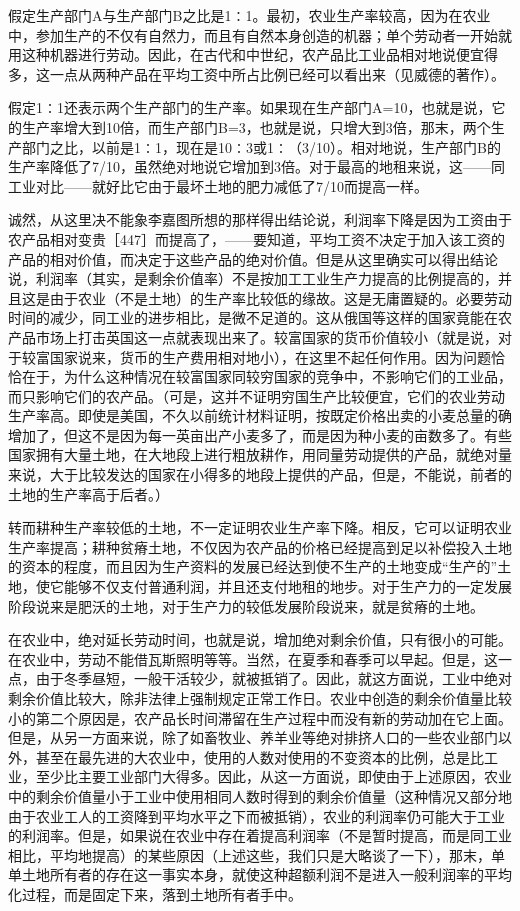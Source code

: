 假定生产部门A与生产部门B之比是1∶1。最初，农业生产率较高，因为在农业中，参加生产的不仅有自然力，而且有自然本身创造的机器；单个劳动者一开始就用这种机器进行劳动。因此，在古代和中世纪，农产品比工业品相对地说便宜得多，这一点从两种产品在平均工资中所占比例已经可以看出来（见威德的著作）。

假定1∶1还表示两个生产部门的生产率。如果现在生产部门A=10，也就是说，它的生产率增大到10倍，而生产部门B=3，也就是说，只增大到3倍，那末，两个生产部门之比，以前是1∶1，现在是10∶3或1∶（3/10）。相对地说，生产部门B的生产率降低了7/10，虽然绝对地说它增加到3倍。对于最高的地租来说，这——同工业对比——就好比它由于最坏土地的肥力减低了7/10而提高一样。

诚然，从这里决不能象李嘉图所想的那样得出结论说，利润率下降是因为工资由于农产品相对变贵［447］而提高了，——要知道，平均工资不决定于加入该工资的产品的相对价值，而决定于这些产品的绝对价值。但是从这里确实可以得出结论说，利润率（其实，是剩余价值率）不是按加工工业生产力提高的比例提高的，并且这是由于农业（不是土地）的生产率比较低的缘故。这是无庸置疑的。必要劳动时间的减少，同工业的进步相比，是微不足道的。这从俄国等这样的国家竟能在农产品市场上打击英国这一点就表现出来了。较富国家的货币价值较小（就是说，对于较富国家说来，货币的生产费用相对地小），在这里不起任何作用。因为问题恰恰在于，为什么这种情况在较富国家同较穷国家的竞争中，不影响它们的工业品，而只影响它们的农产品。（可是，这并不证明穷国生产比较便宜，它们的农业劳动生产率高。即使是美国，不久以前统计材料证明，按既定价格出卖的小麦总量的确增加了，但这不是因为每一英亩出产小麦多了，而是因为种小麦的亩数多了。有些国家拥有大量土地，在大地段上进行粗放耕作，用同量劳动提供的产品，就绝对量来说，大于比较发达的国家在小得多的地段上提供的产品，但是，不能说，前者的土地的生产率高于后者。）

转而耕种生产率较低的土地，不一定证明农业生产率下降。相反，它可以证明农业生产率提高；耕种贫瘠土地，不仅因为农产品的价格已经提高到足以补偿投入土地的资本的程度，而且因为生产资料的发展已经达到使不生产的土地变成“生产的”土地，使它能够不仅支付普通利润，并且还支付地租的地步。对于生产力的一定发展阶段说来是肥沃的土地，对于生产力的较低发展阶段说来，就是贫瘠的土地。

在农业中，绝对延长劳动时间，也就是说，增加绝对剩余价值，只有很小的可能。在农业中，劳动不能借瓦斯照明等等。当然，在夏季和春季可以早起。但是，这一点，由于冬季昼短，一般干活较少，就被抵销了。因此，就这方面说，工业中绝对剩余价值比较大，除非法律上强制规定正常工作日。农业中创造的剩余价值量比较小的第二个原因是，农产品长时间滞留在生产过程中而没有新的劳动加在它上面。但是，从另一方面来说，除了如畜牧业、养羊业等绝对排挤人口的一些农业部门以外，甚至在最先进的大农业中，使用的人数对使用的不变资本的比例，总是比工业，至少比主要工业部门大得多。因此，从这一方面说，即使由于上述原因，农业中的剩余价值量小于工业中使用相同人数时得到的剩余价值量（这种情况又部分地由于农业工人的工资降到平均水平之下而被抵销），农业的利润率仍可能大于工业的利润率。但是，如果说在农业中存在着提高利润率（不是暂时提高，而是同工业相比，平均地提高）的某些原因（上述这些，我们只是大略谈了一下），那末，单单土地所有者的存在这一事实本身，就使这种超额利润不是进入一般利润率的平均化过程，而是固定下来，落到土地所有者手中。

